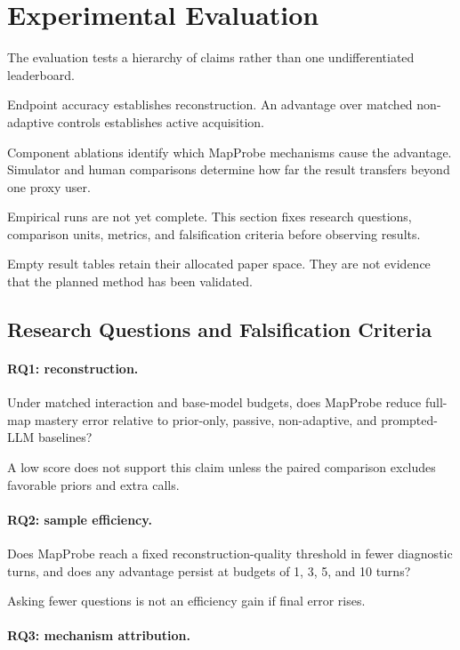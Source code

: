 \section{Experimental Evaluation}
\label{sec:experiments}

The evaluation tests a hierarchy of claims rather than one undifferentiated leaderboard.

Endpoint accuracy establishes reconstruction. An advantage over matched non-adaptive controls
establishes active acquisition.

Component ablations identify which MapProbe mechanisms cause the advantage. Simulator and human
comparisons determine how far the result transfers beyond one proxy user.

Empirical runs are not yet complete. This section fixes research questions, comparison units, metrics,
and falsification criteria before observing results.

Empty result tables retain their allocated paper space. They are not evidence that the planned method
has been validated.

\subsection{Research Questions and Falsification Criteria}

\paragraph{RQ1: reconstruction.}

Under matched interaction and base-model budgets, does MapProbe reduce full-map mastery error relative
to prior-only, passive, non-adaptive, and prompted-LLM baselines?

A low score does not support this claim unless the paired comparison excludes favorable priors and extra
calls.

\paragraph{RQ2: sample efficiency.}

Does MapProbe reach a fixed reconstruction-quality threshold in fewer diagnostic turns, and does any
advantage persist at budgets of 1, 3, 5, and 10 turns?

Asking fewer questions is not an efficiency gain if final error rises.

\paragraph{RQ3: mechanism attribution.}

